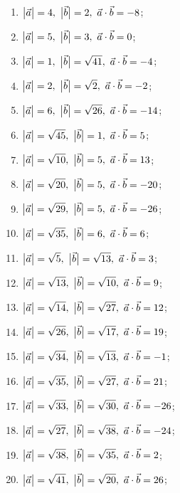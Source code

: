 	\begin{enumerate}
		\setcounter{enumi}{\value{tasks}}

			\item \( \displaystyle \bigl\vert \vec{a} \bigr\vert = 4, ~ \bigl\vert \vec{b} \bigr\vert = 2, ~ \vec{a} \cdot \vec{b} = -8 \);
			\item \( \displaystyle \bigl\vert \vec{a} \bigr\vert = 5, ~ \bigl\vert \vec{b} \bigr\vert = 3, ~ \vec{a} \cdot \vec{b} = 0 \);
			\item \( \displaystyle \bigl\vert \vec{a} \bigr\vert = 1, ~ \bigl\vert \vec{b} \bigr\vert = \sqrt{41}, ~ \vec{a} \cdot \vec{b} = -4 \);
			\item \( \displaystyle \bigl\vert \vec{a} \bigr\vert = 2, ~ \bigl\vert \vec{b} \bigr\vert = \sqrt{2}, ~ \vec{a} \cdot \vec{b} = -2 \);
			\item \( \displaystyle \bigl\vert \vec{a} \bigr\vert = 6, ~ \bigl\vert \vec{b} \bigr\vert = \sqrt{26}, ~ \vec{a} \cdot \vec{b} = -14 \);
			\item \( \displaystyle \bigl\vert \vec{a} \bigr\vert = \sqrt{45}, ~ \bigl\vert \vec{b} \bigr\vert = 1, ~ \vec{a} \cdot \vec{b} = 5 \);
			\item \( \displaystyle \bigl\vert \vec{a} \bigr\vert = \sqrt{10}, ~ \bigl\vert \vec{b} \bigr\vert = 5, ~ \vec{a} \cdot \vec{b} = 13 \);
			\item \( \displaystyle \bigl\vert \vec{a} \bigr\vert = \sqrt{20}, ~ \bigl\vert \vec{b} \bigr\vert = 5, ~ \vec{a} \cdot \vec{b} = -20 \);
			\item \( \displaystyle \bigl\vert \vec{a} \bigr\vert = \sqrt{29}, ~ \bigl\vert \vec{b} \bigr\vert = 5, ~ \vec{a} \cdot \vec{b} = -26 \);
			\item \( \displaystyle \bigl\vert \vec{a} \bigr\vert = \sqrt{35}, ~ \bigl\vert \vec{b} \bigr\vert = 6, ~ \vec{a} \cdot \vec{b} = 6 \);
			\item \( \displaystyle \bigl\vert \vec{a} \bigr\vert = \sqrt{5}, ~ \bigl\vert \vec{b} \bigr\vert = \sqrt{13}, ~ \vec{a} \cdot \vec{b} = 3 \);
			\item \( \displaystyle \bigl\vert \vec{a} \bigr\vert = \sqrt{13}, ~ \bigl\vert \vec{b} \bigr\vert = \sqrt{10}, ~ \vec{a} \cdot \vec{b} = 9 \);
			\item \( \displaystyle \bigl\vert \vec{a} \bigr\vert = \sqrt{14}, ~ \bigl\vert \vec{b} \bigr\vert = \sqrt{27}, ~ \vec{a} \cdot \vec{b} = 12 \);
			\item \( \displaystyle \bigl\vert \vec{a} \bigr\vert = \sqrt{26}, ~ \bigl\vert \vec{b} \bigr\vert = \sqrt{17}, ~ \vec{a} \cdot \vec{b} = 19 \);
			\item \( \displaystyle \bigl\vert \vec{a} \bigr\vert = \sqrt{34}, ~ \bigl\vert \vec{b} \bigr\vert = \sqrt{13}, ~ \vec{a} \cdot \vec{b} = -1 \);
			\item \( \displaystyle \bigl\vert \vec{a} \bigr\vert = \sqrt{35}, ~ \bigl\vert \vec{b} \bigr\vert = \sqrt{27}, ~ \vec{a} \cdot \vec{b} = 21 \);
			\item \( \displaystyle \bigl\vert \vec{a} \bigr\vert = \sqrt{33}, ~ \bigl\vert \vec{b} \bigr\vert = \sqrt{30}, ~ \vec{a} \cdot \vec{b} = -26 \);
			\item \( \displaystyle \bigl\vert \vec{a} \bigr\vert = \sqrt{27}, ~ \bigl\vert \vec{b} \bigr\vert = \sqrt{38}, ~ \vec{a} \cdot \vec{b} = -24 \);
			\item \( \displaystyle \bigl\vert \vec{a} \bigr\vert = \sqrt{38}, ~ \bigl\vert \vec{b} \bigr\vert = \sqrt{35}, ~ \vec{a} \cdot \vec{b} = 2 \);
			\item \( \displaystyle \bigl\vert \vec{a} \bigr\vert = \sqrt{41}, ~ \bigl\vert \vec{b} \bigr\vert = \sqrt{20}, ~ \vec{a} \cdot \vec{b} = 26 \);
			
		\setcounter{tasks}{\value{enumi}}
	\end{enumerate}
